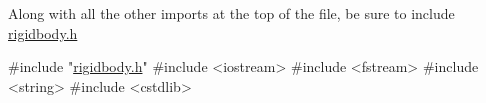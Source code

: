 Along with all the other imports at the top of the file, be sure to include {\ttfamily \mbox{\hyperlink{rigidbody_8h}{rigidbody.\+h}}}


\begin{DoxyCode}
\textcolor{preprocessor}{#include "\mbox{\hyperlink{rigidbody_8h}{rigidbody.h}}"}
\textcolor{preprocessor}{#include <iostream>}
\textcolor{preprocessor}{#include <fstream>}
\textcolor{preprocessor}{#include <string>}
\textcolor{preprocessor}{#include <cstdlib>}
\end{DoxyCode}
 